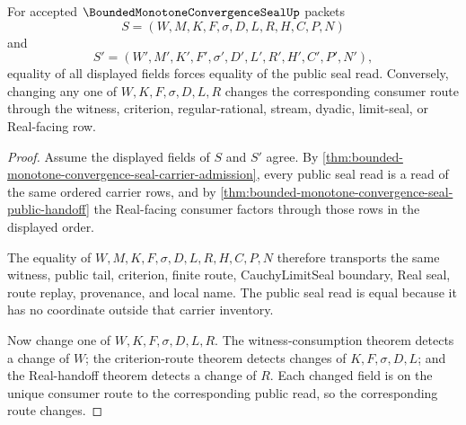 \begin{theorem}
\label{thm:bounded-monotone-convergence-seal-field-faithfulness}
For accepted $\BoundedMonotoneConvergenceSealUp$ packets
$$
S=(W,M,K,F,\sigma,D,L,R,H,C,P,N)
$$
and
$$
S'=(W',M',K',F',\sigma',D',L',R',H',C',P',N'),
$$
equality of all displayed fields forces equality of the public seal read. Conversely, changing any one of $W,K,F,\sigma,D,L,R$ changes the corresponding consumer route through the witness, criterion, regular-rational, stream, dyadic, limit-seal, or Real-facing row.
\end{theorem}
\begin{proof}
Assume the displayed fields of $S$ and $S'$ agree. By \autoref{thm:bounded-monotone-convergence-seal-carrier-admission}, every public seal read is a read of the same ordered carrier rows, and by \autoref{thm:bounded-monotone-convergence-seal-public-handoff} the Real-facing consumer factors through those rows in the displayed order.

The equality of $W,M,K,F,\sigma,D,L,R,H,C,P,N$ therefore transports the same witness, public tail, criterion, finite route, CauchyLimitSeal boundary, Real seal, route replay, provenance, and local name. The public seal read is equal because it has no coordinate outside that carrier inventory.

Now change one of $W,K,F,\sigma,D,L,R$. The witness-consumption theorem detects a change of $W$; the criterion-route theorem detects changes of $K,F,\sigma,D,L$; and the Real-handoff theorem detects a change of $R$. Each changed field is on the unique consumer route to the corresponding public read, so the corresponding route changes.
\end{proof}

